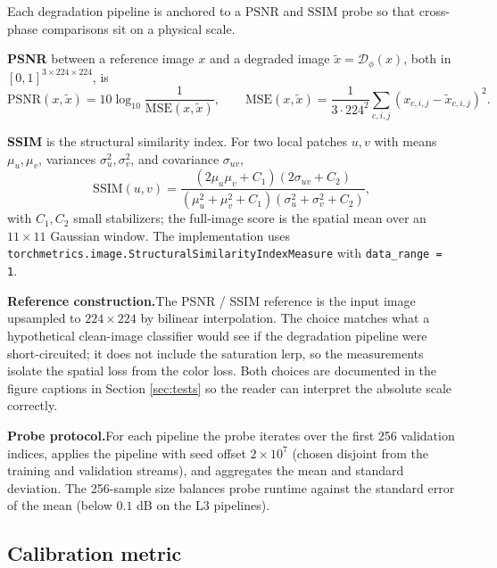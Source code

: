 Each degradation pipeline is anchored to a $\mathrm{PSNR}$ and $\mathrm{SSIM}$
probe so that cross-phase comparisons sit on a physical scale.

\textbf{PSNR} \cite{huynh2008psnr} between a reference image $x$ and a
degraded image $\tilde x = \mathcal{D}_{\phi}(x)$, both in $[0, 1]^{3 \times 224 \times 224}$, is
\begin{equation}
  \mathrm{PSNR}(x, \tilde x) = 10 \log_{10} \frac{1}{\mathrm{MSE}(x, \tilde x)},
  \qquad
  \mathrm{MSE}(x, \tilde x) = \frac{1}{3 \cdot 224^2} \sum_{c, i, j} (x_{c,i,j} - \tilde x_{c,i,j})^2.
  \label{eq:psnr}
\end{equation}

\textbf{SSIM} \cite{wang2004ssim} is the structural similarity index. For
two local patches $u, v$ with means $\mu_u, \mu_v$, variances
$\sigma_u^2, \sigma_v^2$, and covariance $\sigma_{uv}$,
\begin{equation}
  \mathrm{SSIM}(u, v) = \frac{(2 \mu_u \mu_v + C_1)(2 \sigma_{uv} + C_2)}{(\mu_u^2 + \mu_v^2 + C_1)(\sigma_u^2 + \sigma_v^2 + C_2)},
  \label{eq:ssim}
\end{equation}
with $C_1, C_2$ small stabilizers; the full-image score is the spatial mean
over an $11 \times 11$ Gaussian window. The implementation uses
\texttt{torchmetrics.image.StructuralSimilarityIndexMeasure} with
\texttt{data\_range = 1}.

\textbf{Reference construction.}\quad The PSNR / SSIM reference is the
input image upsampled to $224 \times 224$ by bilinear interpolation. The
choice matches what a hypothetical clean-image classifier would see if the
degradation pipeline were short-circuited; it does not include the
saturation lerp, so the measurements isolate the spatial loss from the
color loss. Both choices are documented in the figure captions in
Section \ref{sec:tests} so the reader can interpret the absolute scale
correctly.

\textbf{Probe protocol.}\quad For each pipeline the probe iterates over
the first 256 validation indices, applies the pipeline with seed offset
$2 \times 10^7$ (chosen disjoint from the training and validation streams),
and aggregates the mean and standard deviation. The 256-sample size
balances probe runtime against the standard error of the mean (below
$0.1$ dB on the L3 pipelines).

\subsection{Calibration metric}
\label{sec:design:ece}

